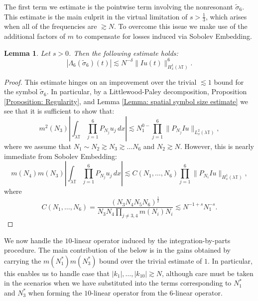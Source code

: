 \documentclass[12pt, letterpaper]{amsart}
\newtheorem{lemma}{Lemma}
\begin{document}
The first term we estimate is the pointwise term involving the nonresonant $\tilde{\sigma}_6$. This estimate is the main culprit in the virtual limitation of $s > \frac13$, which arises when all of the frequencies are $\gtrsim N$. To overcome this issue we make use of the additional factors of $m$ to compensate for losses induced via Sobolev Embedding.
\begin{lemma}\label{Lemma: Pointwise tilde sigma 6}
    Let $s > 0$. Then the following estimate holds:
    \[
|\Lambda_6(\tilde{\sigma}_6)(t)|\lesssim N^{-\delta}\|Iu(t)\|_{H^1_x(\lambda\mathbb{T})}^6.
    \]
\end{lemma}
\begin{proof}
    This estimate hinges on an improvement over the trivial $\lesssim 1$ bound for the symbol $\tilde{\sigma}_6$. In particular, by a Littlewood-Paley decomposition, Proposition \ref{Proposition: Regularity}, and Lemma \ref{Lemma: spatial symbol size estimate} we see that it is sufficient to show that:
    \[
    m^2(N_3)\left|\int_{\lambda\mathbb{T}} \prod_{j=1}^6 P_{N_j}u_j\,dx\right|\lesssim N_1^{0-}\prod_{j=1}^6\|P_{N_j}Iu\|_{L^2_x(\lambda \mathbb{T})},
    \]
    where we assume that $N_1\sim N_2\gtrsim N_3\gtrsim\dots N_6$ and $N_2\gtrsim N$. However, this is nearly immediate from Sobolev Embedding:
    \[
        m(N_4)m(N_3)\left|\int_{\lambda\mathbb{T}} \prod_{j=1}^6 P_{N_j}u_j\,dx\right|
        \lesssim C(N_1,\dots, N_6)\prod_{j=1}^6\|P_{N_i}Iu\|_{H^1_x(\lambda\mathbb{T})},
    \]
    where
    \[
        C(N_1,\dots, N_6) = \frac{(N_3N_4N_5N_6)^{\frac12}}{N_3N_4\prod_{j\ne 3,4}m(N_i)N_i}
        \lesssim N^{-1+s}N_1^{-s}.
    \]
\end{proof}

We now handle the $10$-linear operator induced by the integration-by-parts procedure. The main contribution of the below is in the gains obtained by carrying the $m(N_1^*)m(N_3^*)$ bound over the trivial estimate of $1$. In particular, this enables us to handle case that $|k_1|,\dots, |k_{10}|\gtrsim N$, although care must be taken in the scenarios when we have substituted into the terms corresponding to $N_1^*$ and $N_3^*$ when forming the $10$-linear operator from the $6$-linear operator.
\end{document}
